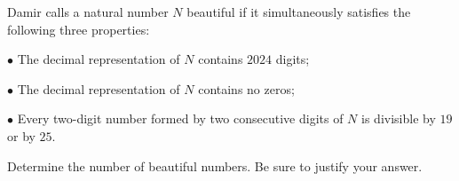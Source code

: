 Damir calls a natural number $N$ beautiful if it simultaneously satisfies the following three properties:

$\bullet$ The decimal representation of $N$ contains $2024$ digits;

$\bullet$ The decimal representation of $N$ contains no zeros;

$\bullet$ Every two-digit number formed by two consecutive digits of $N$ is divisible by $19$ or by $25$.

Determine the number of beautiful numbers. Be sure to justify your answer.

